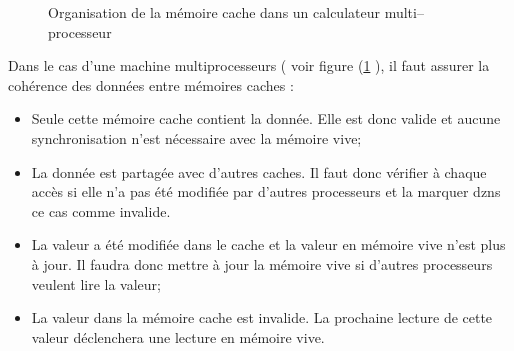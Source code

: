 \documentclass[fleqn,11pt]{article}
\begin{document}
\begin{itemize}
\begin{itemize}
\begin{figure}[h]
\begin{center}
\end{center}
\caption{Organisation de la mémoire cache dans un calculateur multi--processeur}
\label{fig:cachemultiproc}
\end{figure}

Dans le cas d'une machine multiprocesseurs ( voir figure (\ref{fig:cachemultiproc} ), il faut assurer la cohérence des données entre mémoires caches :
\begin{itemize}
\item Seule cette mémoire cache contient la donnée. Elle est donc valide et aucune synchronisation n'est nécessaire avec la mémoire vive;
\item La donnée est partagée avec d'autres caches. Il faut donc vérifier à chaque accès si elle n'a pas été modifiée par d'autres processeurs et la marquer dzns ce cas comme invalide.
\item La valeur a été modifiée dans le cache et la valeur en mémoire vive n'est plus à jour. Il faudra donc mettre à jour la mémoire vive si d'autres processeurs veulent lire la valeur;
\item La valeur dans la mémoire cache est invalide. La prochaine lecture de cette valeur déclenchera une lecture en mémoire vive. 
\end{itemize}


\end{itemize}
\end{itemize}
\end{document}
